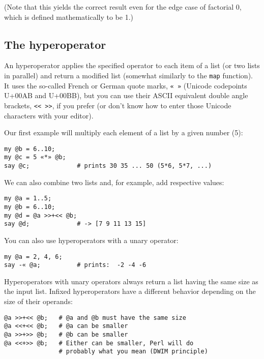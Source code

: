 (Note that this yields the correct result even for the 
edge case of factorial 0, which is defined mathematically 
to be 1.)

\subsection{The hyperoperator}

An hyperoperator applies the specified operator to each 
item of a list (or two lists in parallel) and return a 
modified list (somewhat similarly to the {\tt map} 
function). It uses the so-called French or German 
quote marks, \verb'« »' (Unicode codepoints U+00AB 
and U+00BB), but you can use their ASCII equivalent 
double angle brackets, \verb'<< >>', if you prefer 
(or don't know how to enter those Unicode characters 
with your editor).

Our first example will multiply each element of a list 
by a given number (5):

\begin{verbatim}
my @b = 6..10;
my @c = 5 «*» @b;
say @c;             # prints 30 35 ... 50 (5*6, 5*7, ...)
\end{verbatim}

We can also combine two lists and, for example, add 
respective values:

\begin{verbatim}
my @a = 1..5;
my @b = 6..10;
my @d = @a >>+<< @b;
say @d;             # -> [7 9 11 13 15]
\end{verbatim}

You can also use hyperoperators with a unary operator:

\begin{verbatim}
my @a = 2, 4, 6;
say -« @a;          # prints:  -2 -4 -6
\end{verbatim}

Hyperoperators with unary operators always return a 
list having the same size as the input list. Infixed 
hyperoperators have a different behavior depending on 
the size of their operands:

\begin{verbatim}
@a >>+<< @b;   # @a and @b must have the same size
@a <<+<< @b;   # @a can be smaller
@a >>+>> @b;   # @b can be smaller
@a <<+>> @b;   # Either can be smaller, Perl will do 
               # probably what you mean (DWIM principle)
\end{verbatim}

